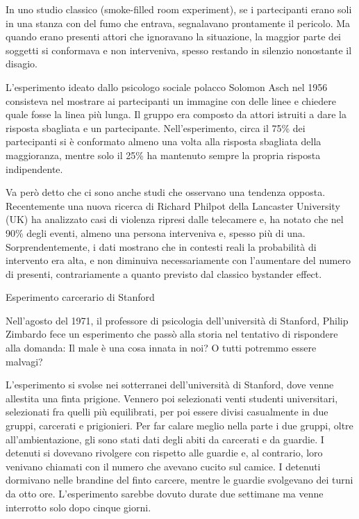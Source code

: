 \documentclass[12pt]{book} %
\begin{document}
\begin{mdframed}[linewidth=1pt]
In uno studio classico (smoke-filled room experiment), se i partecipanti erano soli in una stanza con del fumo che entrava, segnalavano prontamente il pericolo. Ma quando erano presenti attori che ignoravano la situazione, la maggior parte dei soggetti si conformava e non interveniva, spesso restando in silenzio nonostante il disagio.

L'esperimento ideato dallo psicologo sociale polacco Solomon Asch nel 1956 consisteva nel mostrare ai partecipanti un
immagine con delle linee e chiedere quale fosse la linea più lunga. Il gruppo era composto da attori istruiti a dare la
risposta sbagliata e un partecipante. Nell'esperimento, circa il 75\% dei partecipanti si è conformato almeno una volta alla risposta sbagliata della maggioranza, mentre solo il 25\% ha mantenuto sempre la propria risposta indipendente.

Va però detto che ci sono anche studi che osservano una tendenza opposta. Recentemente una nuova ricerca di Richard
Philpot della Lancaster University (UK) ha analizzato casi di violenza ripresi dalle telecamere e, ha notato che nel
90\% degli eventi, almeno una persona interveniva e, spesso più di una. Sorprendentemente, i dati mostrano che in contesti reali la probabilità di intervento era alta, e non diminuiva necessariamente con l’aumentare del numero di presenti, contrariamente a quanto previsto dal classico bystander effect.

Esperimento carcerario di Stanford 

Nell'agosto del 1971, il professore di psicologia dell'università di Stanford,
Philip Zimbardo fece un esperimento che passò alla storia nel tentativo di rispondere alla domanda: Il male è una cosa
innata in noi? O tutti potremmo essere malvagi?

L'esperimento si svolse nei sotterranei dell'università di Stanford, dove
venne allestita una finta prigione. Vennero poi selezionati venti studenti universitari, selezionati fra quelli più
equilibrati, per poi essere divisi casualmente in due gruppi, carcerati e prigionieri. Per far calare meglio nella
parte i due gruppi, oltre all'ambientazione, gli sono stati dati degli abiti da carcerati e da
guardie. I detenuti si dovevano rivolgere con rispetto alle guardie e, al contrario, loro venivano chiamati con il numero
che avevano cucito sul camice. I detenuti dormivano nelle brandine del finto carcere, mentre le guardie svolgevano dei
turni da otto ore. L'esperimento sarebbe dovuto durate due settimane ma venne interrotto solo dopo
cinque giorni.


\end{mdframed}
\end{document}
